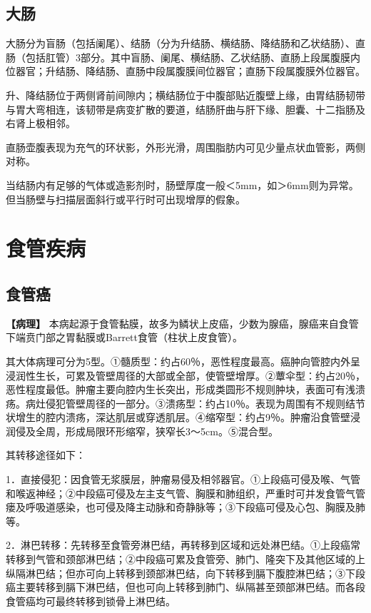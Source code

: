 \subsection{大肠}

大肠分为盲肠（包括阑尾）、结肠（分为升结肠、横结肠、降结肠和乙状结肠）、直肠（包括肛管）3部分。其中盲肠、阑尾、横结肠、乙状结肠、直肠上段属腹膜内位器官；升结肠、降结肠、直肠中段属腹膜间位器官；直肠下段属腹膜外位器官。

升、降结肠位于两侧肾前间隙内；横结肠位于中腹部贴近腹壁上缘，由胃结肠韧带与胃大弯相连，该韧带是病变扩散的要道，结肠肝曲与肝下缘、胆囊、十二指肠及右肾上极相邻。

直肠壶腹表现为充气的环状影，外形光滑，周围脂肪内可见少量点状血管影，两侧对称。

当结肠内有足够的气体或造影剂时，肠壁厚度一般＜5mm，如＞6mm则为异常。但当肠壁与扫描层面斜行或平行时可出现增厚的假象。

\section{食管疾病}

\subsection{食管癌}

\textbf{【病理】}
本病起源于食管黏膜，故多为鳞状上皮癌，少数为腺癌，腺癌来自食管下端贲门部之胃黏膜或Barrett食管（柱状上皮食管）。

其大体病理可分为5型。①髓质型：约占60％，恶性程度最高。癌肿向管腔内外呈浸润性生长，可累及管壁周径的大部或全部，使管壁增厚。②蕈伞型：约占20％，恶性程度最低。肿瘤主要向腔内生长突出，形成类圆形不规则肿块，表面可有浅溃疡。病灶侵犯管壁周径的一部分。③溃疡型：约占10％。表现为周围有不规则结节状增生的腔内溃疡，深达肌层或穿透肌层。④缩窄型：约占9％。肿瘤沿食管壁浸润侵及全周，形成局限环形缩窄，狭窄长3～5cm。⑤混合型。

其转移途径如下：

1．直接侵犯：因食管无浆膜层，肿瘤易侵及相邻器官。①上段癌可侵及喉、气管和喉返神经；②中段癌可侵及左主支气管、胸膜和肺组织，严重时可并发食管气管瘘及呼吸道感染，也可侵及降主动脉和奇静脉等；③下段癌可侵及心包、胸膜及肺等。

2．淋巴转移：先转移至食管旁淋巴结，再转移到区域和远处淋巴结。①上段癌常转移到气管和颈部淋巴结；②中段癌可累及食管旁、肺门、隆突下及其他区域的上纵隔淋巴结；但亦可向上转移到颈部淋巴结，向下转移到膈下腹腔淋巴结；③下段癌主要转移到膈下淋巴结，但也可向上转移到肺门、纵隔甚至颈部淋巴结。而各段食管癌均可最终转移到锁骨上淋巴结。

